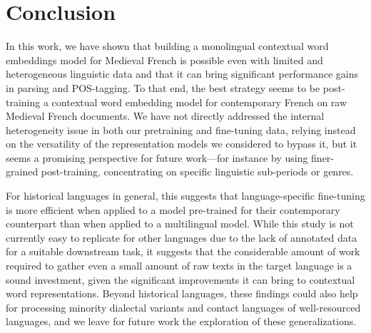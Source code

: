 \section{Conclusion}

In this work, we have shown that building a monolingual contextual word embeddings model for Medieval French is possible even with limited and heterogeneous linguistic data and that it can bring significant performance gains in parsing and POS-tagging.
To that end, the best strategy seems to be post-training a contextual word embedding model for contemporary French on raw Medieval French documents.
We have not directly addressed the internal heterogeneity issue in both our pretraining and fine-tuning data, relying instead on the versatility of the representation models we considered to bypass it, but it seems a promising perspective for future work---for instance by using finer-grained post-training, concentrating on specific linguistic sub-periods or genres.

For historical languages in general, this suggests that language-specific fine-tuning is more efficient when applied to a model pre-trained for their contemporary counterpart than when applied to a multilingual model.
While this study is not currently easy to replicate for other languages due to the lack of annotated data for a suitable downstream task, it suggests that the considerable amount of work required to gather even a small amount of raw texts in the target language is a sound investment, given the significant improvements it can bring to contextual word representations.
Beyond historical languages, these findings could also help for processing minority dialectal variants and contact languages of well-resourced languages, and we leave for future work the exploration of these generalizations.

% 

